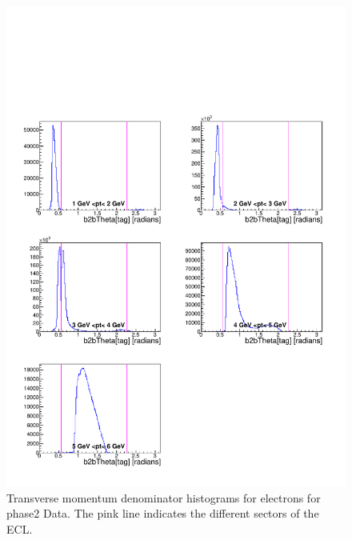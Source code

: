 \documentclass[a4paper,11pt,twosided,final,german,openbib,pdftex,listof=totoc,bibliography=totoc]{scrbook}
\begin{document}
\begin{appendix}
\begin{figure}[!htbp]
	\centering
	\includegraphics[width=\textwidth]{Plots/master/xPtMThetaemD_Data}
	\caption[Transverse Momentum $\phi$ Electrons Denominator Histogram Phase2 Data]{Transverse momentum denominator histograms for electrons for phase2 Data. The pink line indicates the different sectors of the ECL.}
	\label{plt:PtMThetaemD_Data}
\end{figure}


\end{appendix}
\end{document}
